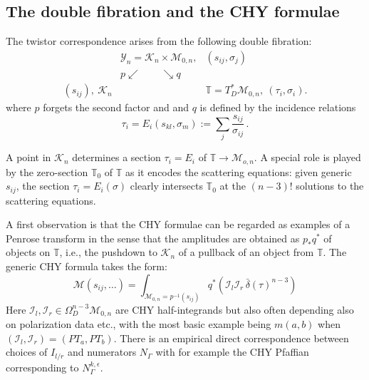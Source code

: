 \documentclass[11pt]{article}
\newcommand{\R}{\mathbb{R}}
\newcommand{\T}{\mathbb{T}}
\newcommand{\cK}{\mathcal{K}}
\newcommand{\cI}{\mathcal{I}}
\newcommand{\cM}{\mathcal{M}}
\newcommand{\cY}{\mathcal{Y}}
\newcommand{\1}{{\rm 1\hskip-0.25em I}}
\begin{document}

\subsection{The double fibration and the CHY formulae}
The twistor correspondence  arises from the following double fibration:
\begin{eqnarray}
~& \cY_n=\cK_n\times \cM_{0,n},&(s_{ij},\sigma_j)\nonumber\\
&p\swarrow\qquad\searrow q&\nonumber\\
(s_{ij}),~ \cK_n&&\T= T^*_D \cM_{0,n}, ~ (\tau_i,\sigma_i) . 
\end{eqnarray}
where $p$ forgets the second factor and and
$q$ is defined by  the incidence relations
\begin{equation}
\tau_i =E_i(s_{kl}, \sigma_m):=\sum_j \frac{s_{ij}}{\sigma_{ij}}\, . \label{incidence}
\end{equation}

A point in $\cK_n$ determines a section $\tau_i=E_i$ of $\T\rightarrow \cM_{o,n}$. A special role is played by the zero-section $\T_0$ of $\T$ as it encodes the scattering equations: given generic $s_{ij}$, the section $\tau_i=E_i(\sigma)$ clearly intersects $\T_0$ at the $(n-3)!$ solutions to the scattering equations.

A first observation is that the CHY formulae can be regarded as examples of a Penrose transform in the sense that the amplitudes are obtained as $p_*q^*$  of objects on $\T$, i.e., the pushdown to $\cK_n$ of a pullback of an object from $\T$.  The generic CHY formula takes the form:
\begin{equation}
\cM(s_{ij},\ldots)=\int_{\cM_{0,n}=p^{-1}(s_{ij})} q^*\left(\cI_l \cI_r \,\bar \delta(\tau)^{n-3}\right)
\end{equation}
 Here $\cI_l, \cI_r \in \Omega^{n-3}_D\cM_{0,n}$ are CHY half-integrands but also often depending also on polarization data etc.,  with the most basic example being $m(a,b)$ when  $(\cI_l,\cI_r)=(PT_a,PT_b)$.
 There is an empirical direct correspondence between choices of $I_{l/r}$ and numerators  $N_\Gamma$ with for example the CHY Pfaffian corresponding to $N^{k,\epsilon}_\Gamma$.
\end{document}
